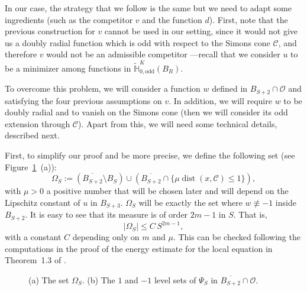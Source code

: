 \documentclass[12pt,reqno]{amsart}
\theoremstyle{definition}
\theoremstyle{remark}
\newcommand{\con}[1]{\mathbb{#1}}
\renewcommand{\H}{\con{H}}
\newcommand{\ccal}{\mathscr{C}}
\newcommand{\ocal}{\mathcal{O}}
\DeclareMathOperator{\dist}{dist}
\numberwithin{equation}{section}
\begin{document}
In our case, the strategy that we follow is the same but we need to adapt some ingredients (such as the competitor $v$ and the function $d$). First, note that the previous construction for $v$ cannot be used in our setting, since it would not give us a doubly radial function which is odd with respect to the Simons cone $\ccal$, and therefore $v$ would not be an admissible competitor ---recall that we consider $u$ to be a minimizer among functions in $\widetilde{\H}^K_{0, \mathrm{odd}}(B_R)$. 

To overcome this problem, we will consider a function $w$ defined in $B_{S+2}\cap \ocal$ and satisfying the four previous assumptions on $v$. In addition, we will require $w$ to be doubly radial and to vanish on the Simons cone (then we will consider its odd extension through $\ccal$). Apart from this, we will need some technical details, described next. 

First, to simplify our proof and be more precise, we define the following set (see Figure~\ref{Fig:PsiSandOmegaS}~(a)):
\begin{equation}
\label{Eq:DefOmegaS}
\Omega_S := \left( \overline{B_{S+2}}\setminus B_S \right) \cup \left(  \overline{B_{S+2}} \cap \{\mu \dist(x,\ccal) \leq 1\}\right),
\end{equation} 
with $\mu>0$ a positive number that will be chosen later and will depend on the Lipschitz constant of $u$ in $B_{S+3}$. $\Omega_S$ will be exactly the set where $w\not \equiv -1$ inside $B_{S+2}$. It is easy to see that its measure is of order $2m-1$ in $S$. That is,
\begin{equation}
\label{Eq:MeasureOmegaS}
|\Omega_S| \leq C\,S^{2m-1},
\end{equation}
with a constant $C$ depending only on $m$ and $\mu$. This can be checked following the computations in the proof of the energy estimate for the local equation in Theorem~1.3 of \cite{CabreTerraI}.

\begin{figure}
	\centering
	\hspace{-0.26\textwidth} 
	\begin{subfigure}{0.21\textwidth}
		\centering
		
	\end{subfigure}
	\hspace{0.28\textwidth} 
	\begin{subfigure}{0.21\textwidth}
		\centering		
		
	\end{subfigure}
	\caption{(a) The set $\Omega_S$. (b) The $1$ and $-1$ level sets of $\Psi_S$ in $\overline{B_{S+2}}\cap \ocal$.}
	\label{Fig:PsiSandOmegaS}
\end{figure}
\end{document}
